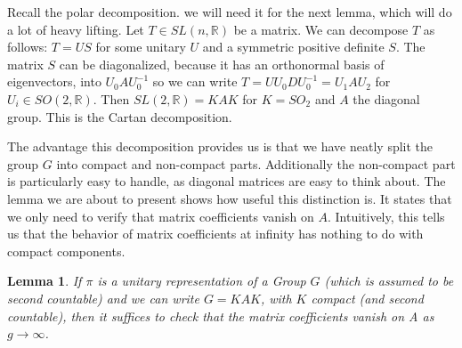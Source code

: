 \documentclass[
  12pt
]{article}
\newtheorem{lem}[thm]{Lemma}
\theoremstyle{plain}
\newcommand{\slnr}{\ensuremath{SL(n, \mathbb{R})}\xspace}
\begin{document}
  Recall the polar decomposition. we will need it for the next lemma, which will do a lot of heavy lifting.
  Let $T \in \slnr$ be a matrix. We can decompose $T$ as follows:
  $T = US$ for some unitary $U$ and a symmetric positive definite $S$. The matrix $S$ can be
  diagonalized, because it has an orthonormal basis of eigenvectors, into $U_0 A U_0^{-1}$ so we can write
  $T = U U_0 D U_0^{-1} = U_1 A U_2$ for $U_i \in SO(2, \mathbb{R})$.
  Then $SL(2, \mathbb{R}) = KAK$ for $K = SO_2$ and $A$ the diagonal
  group. This is the Cartan decomposition.

  The advantage this decomposition provides us is that we have neatly split the group $G$ into compact and non-compact parts.
  Additionally the non-compact part is particularly easy to handle, as diagonal matrices are easy to think about.
  The lemma we are about to present shows how useful this distinction is. It states that we only need to verify that matrix coefficients vanish on $A$.
  Intuitively, this tells us that the behavior of matrix coefficients at infinity has nothing to do with compact components.


  \begin{lem}
    \label{lemma}
    If $\pi$ is a unitary representation of a Group $G$ (which is assumed to be second countable) and we can write $G =
    KAK$, with $K$ compact (and second countable), then it suffices to check that the matrix
    coefficients vanish on A as $g \rightarrow \infty$.
  \end{lem}
\end{document}
